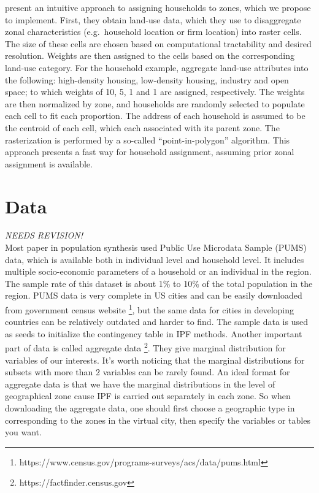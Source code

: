 \documentclass[11pt,twoside]{article}
\numberwithin{equation}{section}
\newcommand{\?}{\stackrel{?}{=}}
\begin{document}
\textcite{moekel2003microsimulation} present an intuitive approach to assigning households to zones, which we propose to implement.
First, they obtain land-use data, which they use to disaggregate zonal characteristics (e.g.\ household location or firm location) into raster cells.
The size of these cells are chosen based on computational tractability and desired resolution.
Weights are then assigned to the cells based on the corresponding land-use category.
For the household example, \textcite{moekel2003microsimulation} aggregate land-use attributes into the following: high-density housing, low-density housing, industry and open space;
to which weights of 10, 5, 1 and 1 are assigned, respectively.
The weights are then normalized by zone, and households are randomly selected to populate each cell to fit each proportion.
The address of each household is assumed to be the centroid of each cell, which each associated with its parent zone.
The rasterization is performed by a so-called ``point-in-polygon'' algorithm.
This approach presents a fast way for household assignment, assuming prior zonal assignment is available.


\section{Data}
{\it NEEDS REVISION!}\\
Most paper in population synthesis used Public Use Microdata Sample (PUMS) data, which is available both in individual level and household level.
It includes multiple socio-economic parameters of a household or an individual in the region.
The sample rate of this dataset is about 1\% to 10\% of the total population in the region. 
PUMS data is very complete in US cities and can be easily downloaded from government census website \footnote{https://www.census.gov/programs-surveys/acs/data/pums.html}, but the same data for cities in developing countries can be relatively outdated and harder to find.
The sample data is used as seeds to initialize the contingency table in IPF methods.
Another important part of data is called aggregate data \footnote{https://factfinder.census.gov}.
They give marginal distribution for variables of our interests.
It's worth noticing that the marginal distributions for subsets with more than 2 variables can be rarely found.
An ideal format for aggregate data is that we have the marginal distributions in the level of geographical zone cause IPF is carried out separately in each zone.
So when downloading the aggregate data, one should first choose a geographic type in corresponding to the zones in the virtual city, then specify the variables or tables you want.
\end{document}
